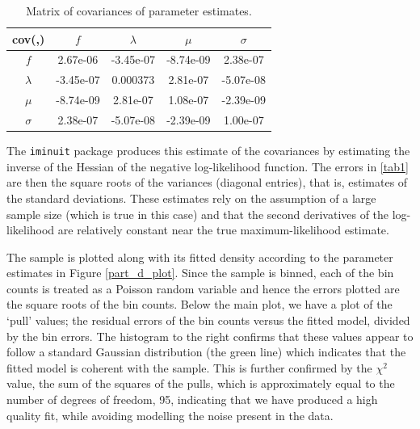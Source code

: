 \documentclass[12pt]{article}
\begin{document}
\begin{table}
    \centering
    \begin{tabular}{| c | c | c | c | c |}
        \hline
        cov(,) & $f$ & $\lambda$ & $\mu$ & $\sigma$ \\
        \hline
        $f$       & 2.67e-06  & -3.45e-07 & -8.74e-09 &  2.38e-07 \\
        \hline
        $\lambda$ & -3.45e-07 &  0.000373 &  2.81e-07 & -5.07e-08 \\
        \hline
        $\mu$     & -8.74e-09 &  2.81e-07 &  1.08e-07 & -2.39e-09 \\
        \hline
        $\sigma$  & 2.38e-07  & -5.07e-08 & -2.39e-09 &  1.00e-07 \\
        \hline
\end{tabular}
\caption{Matrix of covariances of parameter estimates.}
\label{tab2}
\end{table}

The \texttt{iminuit} package produces this estimate of the covariances by estimating the inverse of the Hessian of the negative log-likelihood function.
The errors in \ref{tab1} are then the square roots of the variances (diagonal entries), that is, estimates of the standard deviations.
These estimates rely on the assumption of a large sample size (which is true in this case) and that the second derivatives of the log-likelihood are relatively constant near the true maximum-likelihood estimate.

The sample is plotted along with its fitted density according to the parameter estimates in Figure \ref{part_d_plot}.
Since the sample is binned, each of the bin counts is treated as a Poisson random variable and hence the errors plotted are the square roots of the bin counts.
Below the main plot, we have a plot of the `pull' values; the residual errors of the bin counts versus the fitted model, divided by the bin errors.
The histogram to the right confirms that these values appear to follow a standard Gaussian distribution (the green line) which indicates that the fitted model is coherent with the sample.
This is further confirmed by the $\chi^2$ value, the sum of the squares of the pulls, which is approximately equal to the number of degrees of freedom, 95, indicating that we have produced a high quality fit, while avoiding modelling the noise present in the data.
\end{document}
